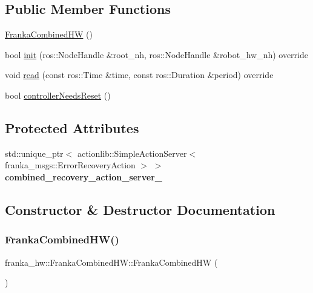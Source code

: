 \subsection*{Public Member Functions}
\begin{DoxyCompactItemize}
\item 
\hyperlink{classfranka__hw_1_1_franka_combined_h_w_aee7f9b585d489d9ecebb55df696c1093}{Franka\+Combined\+HW} ()
\item 
bool \hyperlink{classfranka__hw_1_1_franka_combined_h_w_ae790d07b59ec430f743994b8d4119178}{init} (ros\+::\+Node\+Handle \&root\+\_\+nh, ros\+::\+Node\+Handle \&robot\+\_\+hw\+\_\+nh) override
\item 
void \hyperlink{classfranka__hw_1_1_franka_combined_h_w_a417e3cc255bcf435b68dfce173f8ba3e}{read} (const ros\+::\+Time \&time, const ros\+::\+Duration \&period) override
\item 
bool \hyperlink{classfranka__hw_1_1_franka_combined_h_w_aca9156d9a9d557288db9d1d496ff8306}{controller\+Needs\+Reset} ()
\end{DoxyCompactItemize}
\subsection*{Protected Attributes}
\begin{DoxyCompactItemize}
\item 
\mbox{\label{classfranka__hw_1_1_franka_combined_h_w_a179555fe1be70646ff561faca11f5c3e}} 
std\+::unique\+\_\+ptr$<$ actionlib\+::\+Simple\+Action\+Server$<$ franka\+\_\+msgs\+::\+Error\+Recovery\+Action $>$ $>$ {\bfseries combined\+\_\+recovery\+\_\+action\+\_\+server\+\_\+}
\end{DoxyCompactItemize}


\subsection{Constructor \& Destructor Documentation}
\mbox{\label{classfranka__hw_1_1_franka_combined_h_w_aee7f9b585d489d9ecebb55df696c1093}} 
\subsubsection{\texorpdfstring{Franka\+Combined\+H\+W()}{FrankaCombinedHW()}}
{\footnotesize\ttfamily franka\+\_\+hw\+::\+Franka\+Combined\+H\+W\+::\+Franka\+Combined\+HW (\begin{DoxyParamCaption}{ }\end{DoxyParamCaption})\hspace{0.3cm}{\ttfamily [default]}}

